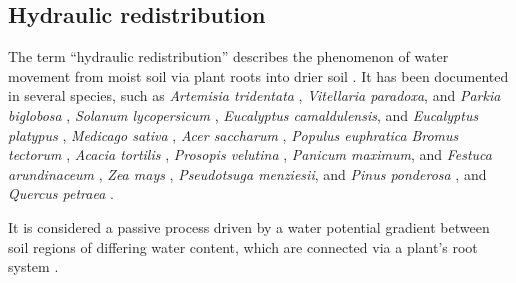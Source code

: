 \subsection{Hydraulic redistribution}

The term ``hydraulic redistribution'' describes the phenomenon of water movement from moist soil via plant roots into drier soil \parencite{burgess_redistribution_1998}.  It has been documented in several species, such as
\emph{Artemisia tridentata} \parencite{richards_hydraulic_1987},
\emph{Vitellaria paradoxa}, and \emph{Parkia biglobosa} \parencite{bayala_hydraulic_2008},
\emph{Solanum lycopersicum} \parencite{bormann_moisture_1957},
\emph{Eucalyptus camaldulensis}, and \emph{Eucalyptus platypus} \parencite{burgess_tree_2001},
\emph{Medicago sativa} \parencite{corak_water_1987},
\emph{Acer saccharum} \parencite{dawson_hydraulic_1993},
\emph{Populus euphratica} \parencite{hao_hydraulic_2010}
\emph{Bromus tectorum} \parencite{leffler_hydraulic_2005},
\emph{Acacia tortilis} \parencite{ludwig_hydraulic_2003},
\emph{Prosopis velutina} \parencite{scott_ecohydrologic_2008},
\emph{Panicum maximum}, and \emph{Festuca arundinaceum} \parencite{sekiya_applying_2011},
\emph{Zea mays} \parencite{wan_hydraulic_2000},
\emph{Pseudotsuga menziesii}, and \emph{Pinus ponderosa} \parencite{warren_hydraulic_2007}, and
\emph{Quercus petraea} \parencite{zapater_evidence_2011}.

It is considered a passive process driven by a water potential gradient between soil regions of differing water content, which are connected via a plant’s root system \parencite{scott_ecohydrologic_2008}.  


